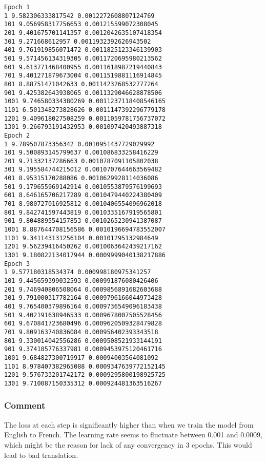 \documentclass[11pt]{article}
\begin{document}
    \begin{Verbatim}[commandchars=\\\{\}]
Epoch 1
1 9.582306333817542 0.0012272608807124769
101 9.056958317756653 0.001215599072308045
201 9.401675701141357 0.0012042635107418354
301 9.271668612957 0.0011932392626943502
401 9.761919856071472 0.0011825123346139903
501 9.571456134319305 0.0011720695980213562
601 9.613771468400955 0.0011618987219440843
701 9.401271879673004 0.0011519881116914845
801 8.88751471042633 0.0011423268532777264
901 9.425382643938065 0.0011329046628878506
1001 9.746580334380269 0.0011237118408546165
1101 6.501348273828626 0.0011147392296779178
1201 9.409618027508259 0.0011059781756737072
1301 9.266793191432953 0.001097420493887318
Epoch 2
1 9.789507873356342 0.0010951437729029992
101 9.500893145799637 0.001086833258416229
201 9.71332137286663 0.0010787091105802038
301 9.195584744215012 0.0010707644663569482
401 8.95315170288086 0.0010629928114036086
501 9.179655969142914 0.0010553879576199693
601 8.646165706217289 0.0010479440224380409
701 8.980727016925812 0.0010406554096962018
801 9.842741597443819 0.0010335167919565801
901 9.804889554157853 0.0010265230941387087
1001 8.887644708156586 0.0010196694783552007
1101 9.341143131256104 0.00101295132984649
1201 9.56239416450262 0.0010063642439217162
1301 9.180822134017944 0.0009999040138217886
Epoch 3
1 9.577180318534374 0.000998180975341257
101 9.445659399032593 0.000991876080426406
201 9.746940806508064 0.0009856891682603688
301 9.791000317782164 0.0009796166044973428
401 9.765400379896164 0.0009736549096183438
501 9.402191638946533 0.0009678007505528456
601 9.670841723680496 0.0009620509328479828
701 9.809163740836084 0.000956402393343518
801 9.330014042556286 0.0009508521933144191
901 9.374185776337981 0.0009453975120461716
1001 9.684827300719917 0.00094003564081092
1101 8.978407382965088 0.0009347639772152145
1201 9.576733201742172 0.0009295800198925725
1301 9.710087150335312 0.000924481363516267

    \end{Verbatim}

    \hypertarget{comment}{%
\subsubsection{Comment}\label{comment}}

The loss at each step is significantly higher than when we train the
model from English to French. The learning rate seems to fluctuate
between 0.001 and 0.0009, which might be the reason for lack of any
convergency in 3 epochs. This would lead to bad translation.
\end{document}
